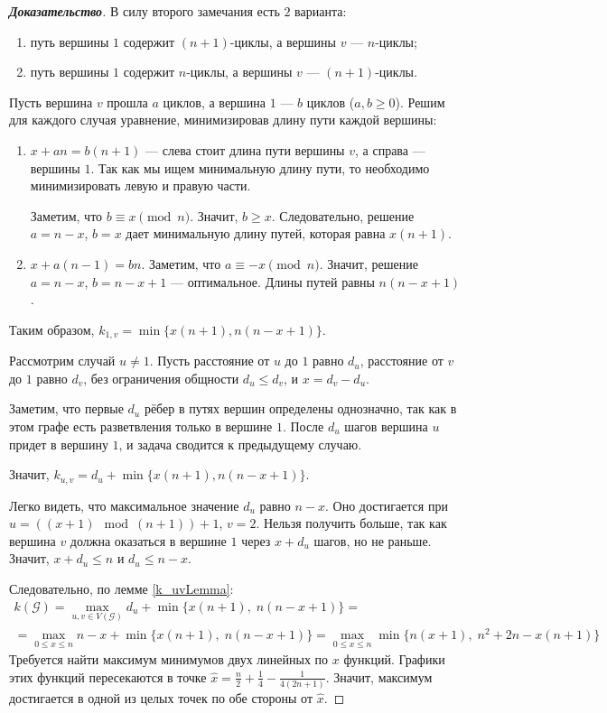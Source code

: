 \documentclass[12pt]{article}
\begin{document}
\begin{proof}[\textbf{Доказательство}]
В силу второго замечания есть $2$ варианта:\begin{enumerate}
\item путь вершины $1$ содержит $(n+1)$-циклы, а вершины $v$ --- $n$-циклы;
\item путь вершины $1$ содержит $n$-циклы, а вершины $v$ --- $(n+1)$-циклы.
\end{enumerate}
Пусть вершина $v$ прошла $a$ циклов, а вершина $1$ --- $b$ циклов ($a, b \ge 0$). Решим для каждого случая уравнение, минимизировав длину пути каждой вершины:
\begin{enumerate}
\item $x + an = b(n + 1)$ --- слева стоит длина пути вершины $v$, а справа --- вершины $1$. Так как мы ищем минимальную длину пути, то необходимо минимизировать левую и правую части.

Заметим, что $b \equiv x \pmod{n}$. Значит, $b \ge x$. Следовательно, решение $a = n - x$, $b = x$ дает минимальную длину путей, которая равна $x(n+1)$.
\item $x + a(n - 1) = bn$. Заметим, что $a \equiv -x \pmod{n}$. Значит, решение $a = n - x$, $b = n - x + 1$ --- оптимальное. Длины путей равны $n(n - x + 1)$.
\end{enumerate}
Таким образом, $k_{1,v} = \min \{x(n+1), n(n - x + 1)\}$.

Рассмотрим случай $u \neq 1$. Пусть расстояние от $u$ до $1$ равно $d_u$, расстояние от $v$ до $1$ равно $d_v$, без ограничения общности $d_u \le d_v$, и $x = d_v - d_u$.

Заметим, что первые $d_u$ рёбер в путях вершин определены однозначно, так как в этом графе есть разветвления только в вершине $1$. После $d_u$ шагов вершина $u$ придет в вершину $1$, и задача сводится к предыдущему случаю.

Значит, $k_{u,v} = d_u + \min \{x(n+1), n(n - x + 1)\}$.

Легко видеть, что максимальное значение $d_u$ равно $n - x$. Оно достигается при $u = ((x + 1)\mod{(n+1)}) + 1$, $v = 2$. Нельзя получить больше, так как вершина $v$ должна оказаться в вершине $1$ через $x + d_u$ шагов, но не раньше. Значит, $x + d_u \le n$ и $d_u \le n - x$.

Следовательно, по лемме \ref{k_uvLemma}:\begin{multline*}
k(\mathcal{G}) = \max_{u, v \in V(\mathcal{G})} d_u + \min \{x(n+1),\; n(n - x + 1)\} =\\= \max_{0 \le x \le n} n - x + \min \{x(n+1),\; n(n - x + 1)\} = 
\max_{0 \le x \le n} \min \{n(x+1),\; n^2 + 2n - x(n+1)\}
\end{multline*}
Требуется найти максимум минимумов двух линейных по $x$ функций. Графики этих функций пересекаются в точке $\hat{x} = \frac{n}{2} + \frac{1}{4} - \frac{1}{4(2n + 1)}$. Значит, максимум 
достигается в одной из целых точек по обе стороны от $\hat{x}$.


\end{proof}
\end{document}
